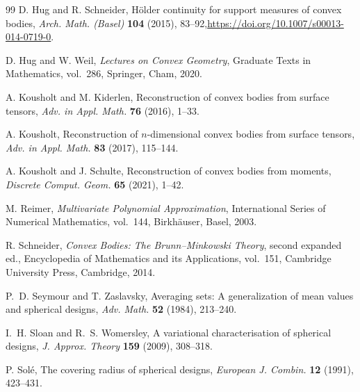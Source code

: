 \documentclass[11pt]{article}
\theoremstyle{definition}
\theoremstyle{remark}
\begin{document}
\begin{thebibliography}{99}
D. Hug and R. Schneider,
\newblock H\"older continuity for support measures of convex bodies,
\newblock \emph{Arch. Math. (Basel)} \textbf{104} (2015), 83--92,\newblock \url{https://doi.org/10.1007/s00013-014-0719-0}.

D. Hug and W. Weil,
\newblock \emph{Lectures on Convex Geometry},
\newblock Graduate Texts in Mathematics, vol.~286, Springer, Cham, 2020.

A. Kousholt and M. Kiderlen,
\newblock Reconstruction of convex bodies from surface tensors,
\newblock \emph{Adv. in Appl. Math.} \textbf{76} (2016), 1--33.

A. Kousholt,
\newblock Reconstruction of $n$-dimensional convex bodies from surface tensors,
\newblock \emph{Adv. in Appl. Math.} \textbf{83} (2017), 115--144.

A. Kousholt and J. Schulte,
\newblock Reconstruction of convex bodies from moments,
\newblock \emph{Discrete Comput. Geom.} \textbf{65} (2021), 1--42.

M. Reimer,
\newblock \emph{Multivariate Polynomial Approximation},
\newblock International Series of Numerical Mathematics, vol.~144, Birkh\"auser, Basel, 2003.

R. Schneider,
\newblock \emph{Convex Bodies: The Brunn--Minkowski Theory}, second expanded ed.,
\newblock Encyclopedia of Mathematics and its Applications, vol.~151, Cambridge University Press, Cambridge, 2014.

P.~D. Seymour and T. Zaslavsky,
\newblock Averaging sets: A generalization of mean values and spherical designs,
\newblock \emph{Adv. Math.} \textbf{52} (1984), 213--240.

I.~H. Sloan and R.~S. Womersley,
\newblock A variational characterisation of spherical designs,
\newblock \emph{J. Approx. Theory} \textbf{159} (2009), 308--318.

P. Sol\'e,
\newblock The covering radius of spherical designs,
\newblock \emph{European J. Combin.} \textbf{12} (1991), 423--431.

\end{thebibliography}
\end{document}
